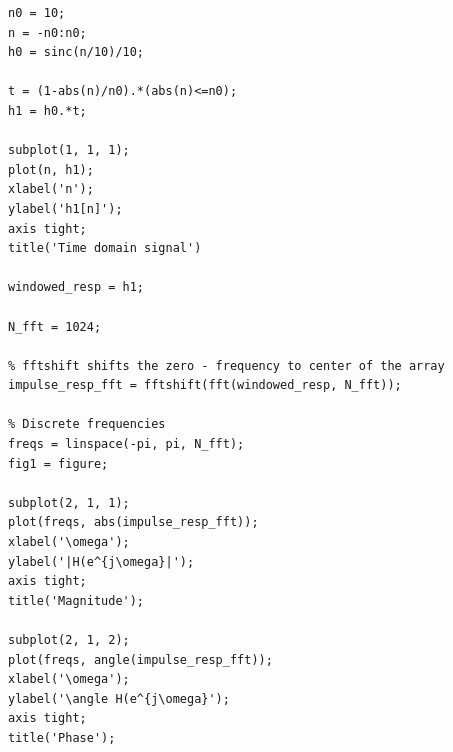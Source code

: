 \documentclass[12pt]{article}
\begin{document}
\begin{enumerate}[label=\textbf{\alph*)}, leftmargin=2.6em]
\begin{verbatim}
n0 = 10;
n = -n0:n0;
h0 = sinc(n/10)/10;

t = (1-abs(n)/n0).*(abs(n)<=n0);
h1 = h0.*t;

subplot(1, 1, 1);
plot(n, h1);
xlabel('n');
ylabel('h1[n]');
axis tight;
title('Time domain signal')

windowed_resp = h1;

N_fft = 1024;

% fftshift shifts the zero - frequency to center of the array
impulse_resp_fft = fftshift(fft(windowed_resp, N_fft));

% Discrete frequencies
freqs = linspace(-pi, pi, N_fft);
fig1 = figure;

subplot(2, 1, 1);
plot(freqs, abs(impulse_resp_fft));
xlabel('\omega');
ylabel('|H(e^{j\omega}|');
axis tight;
title('Magnitude');

subplot(2, 1, 2);
plot(freqs, angle(impulse_resp_fft));
xlabel('\omega');
ylabel('\angle H(e^{j\omega}');
axis tight;
title('Phase');
\end{verbatim}


\end{enumerate}
\end{document}
